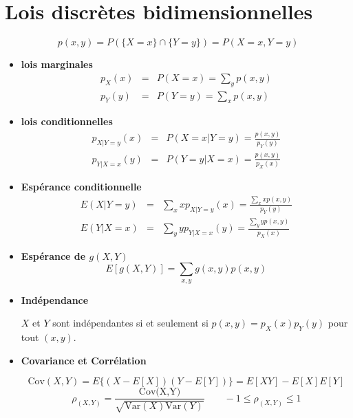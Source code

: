\documentclass[12pt,french]{article}
\begin{document}
%

\newpage
\section*{Lois discr\`etes bidimensionnelles}

$$p(x,y) = P(\{X=x\} \cap \{Y=y\}) = P(X=x, Y=y)$$
\begin{itemize}
\item {\bf lois marginales}
\begin{eqnarray*}
p_X(x) &=& P(X=x) = \sum_y p(x,y) \\
p_Y(y) &=& P(Y=y) = \sum_x p(x,y)
\end{eqnarray*}
\item {\bf lois conditionnelles}
\begin{eqnarray*}
p_{X | Y=y}(x) &=& P(X=x | Y=y) = \frac{p(x,y)}{p_Y(y)} \\
p_{Y | X=x}(y)&=& P(Y=y | X=x) = \frac{p(x,y)}{p_X(x)}
\end{eqnarray*}
\item {\bf Esp\'erance conditionnelle}
\begin{eqnarray*}
E(X|Y=y) &=& \sum_x x p_{X|Y=y}(x) = \frac{\sum_x x p(x,y)}{p_Y(y)} \\
E(Y|X=x) &=& \sum_y y p_{Y|X=x}(y) = \frac{\sum_y y p(x,y)}{p_X(x)}
\end{eqnarray*}
\item {\bf Esp\'erance de $g(X,Y)$}
$$E[g(X,Y)] = \sum_{x,y} g(x,y) p(x,y)$$

\item {\bf Ind\'ependance}

\noindent $X$ et $Y$ sont ind\'ependantes si et seulement si $p(x,y)
= p_X(x) p_Y(y)$ pour tout $(x,y)$.
\item {\bf Covariance et Corr\'elation}

$$\mbox{Cov}(X,Y) = E\{(X-E[X])(Y-E[Y])\} = E[XY] - E[X]E[Y]$$
$${\rho}_{(X,Y)} =
\frac{\mbox{Cov(X,Y)}}{\sqrt{\mbox{Var}(X)\mbox{Var}(Y)}} \quad
\quad -1 \le {\rho}_{(X,Y)} \le 1 $$

\end{itemize}
\end{document}
